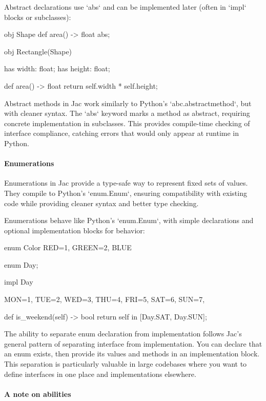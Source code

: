Abstract declarations use `abs` and can be implemented later (often in `impl` blocks or subclasses):

\begin{jacblock}
obj Shape {
    def area() -> float abs;
}

obj Rectangle(Shape) {
    has width: float;
    has height: float;

    def area() -> float { return self.width * self.height; }
}
\end{jacblock}

Abstract methods in Jac work similarly to Python's `abc.abstractmethod`, but with cleaner syntax. The `abs` keyword marks a method as abstract, requiring concrete implementation in subclasses. This provides compile-time checking of interface compliance, catching errors that would only appear at runtime in Python.

\paragraph{Enumerations}

Enumerations in Jac provide a type-safe way to represent fixed sets of values. They compile to Python's `enum.Enum`, ensuring compatibility with existing code while providing cleaner syntax and better type checking.

Enumerations behave like Python's `enum.Enum`, with simple declarations and optional implementation blocks for behavior:

\begin{jacblock}
enum Color { RED=1, GREEN=2, BLUE }

enum Day;

impl Day {
    MON=1, TUE=2, WED=3, THU=4, FRI=5, SAT=6, SUN=7,

    def is_weekend(self) -> bool { return self in [Day.SAT, Day.SUN]; }
}
\end{jacblock}

The ability to separate enum declaration from implementation follows Jac's general pattern of separating interface from implementation. You can declare that an enum exists, then provide its values and methods in an implementation block. This separation is particularly valuable in large codebases where you want to define interfaces in one place and implementations elsewhere.

\paragraph{A note on abilities}

